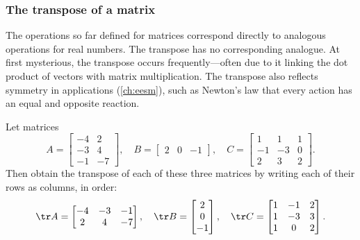 




\subsubsection{The transpose of a matrix}


The operations so far defined for matrices correspond directly to analogous operations for real numbers.
The transpose has no corresponding analogue.
At first mysterious, the transpose occurs frequently---often due to it linking the dot product of vectors with matrix multiplication.
The transpose also reflects symmetry in applications (\autoref{ch:eesm}), such as Newton's law that every action has an equal and opposite reaction.

\begin{example} \label{eg:mattrans}
Let matrices
\begin{equation*}
A=\begin{bmatrix} -4 & 2\\ -3 & 4\\ -1 & -7 \end{bmatrix},\quad
B=\begin{bmatrix} 2 & 0 & -1 \end{bmatrix},\quad
C=\begin{bmatrix} 1 & 1 & 1\\ -1 & -3 & 0\\ 2 & 3 & 2 \end{bmatrix}.
\end{equation*}
Then obtain the transpose of each of these three matrices by writing each of their rows as columns, in order:
\begin{equation*}
\tr A=\begin{bmatrix} -4 & -3 & -1\\ 2 & 4 & -7 \end{bmatrix},\quad
\tr B=\begin{bmatrix} 2\\ 0\\ -1 \end{bmatrix},\quad
\tr C=\begin{bmatrix} 1 & -1 & 2\\ 1 & -3 & 3\\ 1 & 0 & 2 \end{bmatrix}.
\end{equation*}
\end{example}

